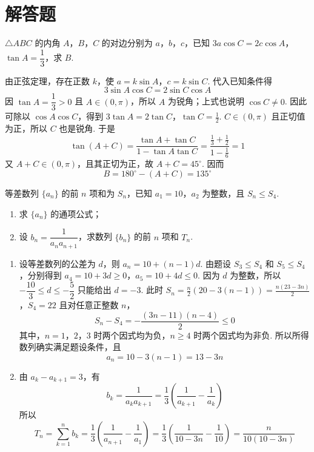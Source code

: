 \section{解答题}

\begin{problem}
\(\triangle ABC\) 的内角 \(A\)，\(B\)，\(C\) 的对边分别为 \(a\)，\(b\)，\(c\)，已知 \(3a\cos C=2c\cos A\)，\(\tan A=\dfrac{1}{3}\)，求 \(B\).
\begin{solution}
由正弦定理，存在正数 \(k\)，使
\(a=k\sin A\)，\(c=k\sin C\). 代入已知条件得
\[
3\sin A\cos C=2\sin C\cos A
\]
因 \(\tan A=\dfrac13>0\) 且 \(A\in\left(0,\pi\right)\)，所以 \(A\) 为锐角；上式也说明
\(\cos C\neq0\). 因此可除以 \(\cos A\cos C\)，得到
\(3\tan A=2\tan C\)，\(\tan C=\frac12\).
\(C\in\left(0,\pi\right)\) 且正切值为正，所以 \(C\) 也是锐角. 于是
\[
\tan(A+C)=\frac{\tan A+\tan C}{1-\tan A\tan C}
=\frac{\frac13+\frac12}{1-\frac16}=1
\]
又 \(A+C\in\left(0,\pi\right)\)，且其正切为正，故
\(A+C=45^{\circ}\). 因而
\[
B=180^{\circ}-(A+C)=135^{\circ}
\]
\end{solution}
\end{problem}

\begin{problem}
等差数列 \(\{a_{n}\}\) 的前 \(n\) 项和为 \(S_{n}\)，已知 \(a_{1}=10\)，\(a_{2}\) 为整数，且 \(S_{n}\leqslant S_{4}\).

\begin{enumerate}
\item 求 \(\{a_{n}\}\) 的通项公式；
\item 设 \(b_{n}=\dfrac{1}{a_{n}a_{n+1}}\)，求数列 \(\{b_{n}\}\) 的前 \(n\) 项和 \(T_{n}\).
\end{enumerate}
\begin{solution}
\begin{enumerate}
\item 设等差数列的公差为 \(d\)，则 \(a_{n}=10+(n-1)d\). 由题设
\(S_{3}\leqslant S_{4}\) 和 \(S_{5}\leqslant S_{4}\)，分别得到
\(a_{4}=10+3d\geqslant0\)，\(a_{5}=10+4d\leqslant0\).
因为 \(d\) 为整数，所以 \(-\dfrac{10}{3}\leqslant d\leqslant-\dfrac52\) 只能给出
\(d=-3\). 此时
\(S_{n}=\frac{n}{2}\left(20-3(n-1)\right)=\frac{n(23-3n)}{2}\)，\(S_{4}=22\)
且对任意正整数 \(n\)，
\[
S_{n}-S_{4}=-\frac{(3n-11)(n-4)}{2}\leqslant0
\]
其中，\(n=1\)，\(2\)，\(3\) 时两个因式均为负，\(n\geqslant4\) 时两个因式均为非负.
所以所得数列确实满足题设条件，且
\[
a_{n}=10-3(n-1)=13-3n
\]
\item 由 \(a_{k}-a_{k+1}=3\)，有
\[
b_{k}=\frac{1}{a_{k}a_{k+1}}
=\frac13\left(\frac1{a_{k+1}}-\frac1{a_{k}}\right)
\]
所以
\[
T_{n}=\sum_{k=1}^{n}b_{k}
=\frac13\left(\frac1{a_{n+1}}-\frac1{a_{1}}\right)
=\frac13\left(\frac1{10-3n}-\frac1{10}\right)
=\frac{n}{10(10-3n)}
\]
\end{enumerate}
\end{solution}
\end{problem}

